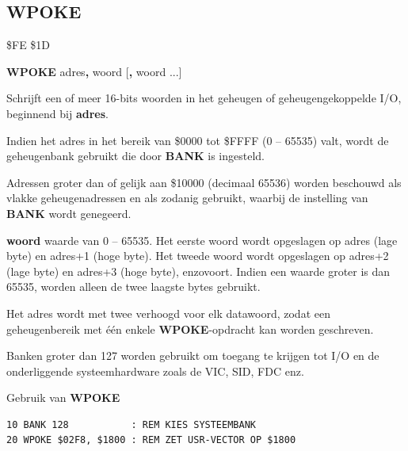 \subsection{WPOKE}
\begin{description}[leftmargin=2cm,style=nextline]
\item [Token:]    \$FE \$1D

\item [Formaat:]   {\bf WPOKE} adres{\bf,} woord [{\bf,} woord ...]

\item [Retourneert:]  Schrijft een of meer 16-bits woorden in het geheugen of geheugengekoppelde I/O, beginnend bij {\bf adres}.

Indien het adres in het bereik van \$0000 tot \$FFFF (0 -- 65535) valt, wordt de geheugenbank gebruikt die door {\bf BANK} is ingesteld.

                  Adressen groter dan of gelijk aan \$10000 (decimaal 65536) worden beschouwd als vlakke geheugenadressen en als zodanig gebruikt, waarbij de instelling van {\bf BANK} wordt genegeerd.

                  {\bf woord} waarde van 0 -- 65535. Het eerste woord wordt opgeslagen op adres (lage byte) en adres+1 (hoge byte). Het tweede woord wordt opgeslagen op adres+2 (lage byte) en adres+3 (hoge byte), enzovoort. Indien een waarde groter is dan 65535, worden alleen de twee laagste bytes gebruikt.

\item [Opmerkingen:]  Het adres wordt met twee verhoogd voor elk datawoord, zodat een geheugenbereik met één enkele {\bf WPOKE}-opdracht kan worden geschreven.

                  Banken groter dan 127 worden gebruikt om toegang te krijgen tot I/O en de onderliggende systeemhardware zoals de VIC, SID, FDC enz.

\item [Voorbeeld:]  Gebruik van {\bf WPOKE}

\begin{tcolorbox}[colback=black,coltext=white]
\verbatimfont{\codefont}
\begin{verbatim}
10 BANK 128           : REM KIES SYSTEEMBANK
20 WPOKE $02F8, $1800 : REM ZET USR-VECTOR OP $1800
\end{verbatim}
\end{tcolorbox}
\end{description}


